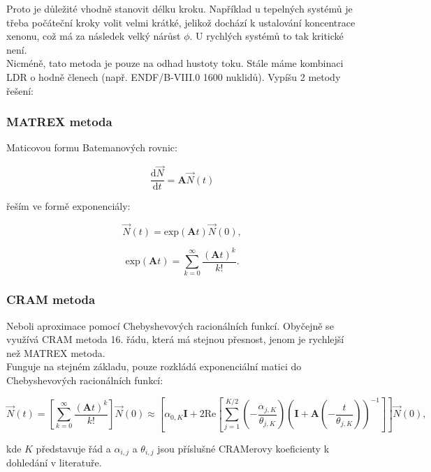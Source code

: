 Proto je důležité vhodně stanovit délku kroku. Například u tepelných systémů je třeba počáteční kroky volit velmi krátké, jelikož dochází k ustalování koncentrace xenonu, což má za následek velký nárůst $\phi$. U rychlých systémů to tak kritické není.\\

Nicméně, tato metoda je pouze na odhad hustoty toku. Stále máme kombinaci LDR o hodně členech (např. ENDF/B-VIII.0 1600 nuklidů). Vypíšu 2 metody řešení:

\subsubsection{MATREX metoda}

Maticovou formu Batemanových rovnic:

\begin{equation}
  \dfrac{\text{d}\vec{N}}{\text{d}t} = \textbf{A} \vec{N}(t)
\end{equation}

řeším ve formě exponenciály:

\begin{equation}
  \vec{N}(t) = \text{exp} (\textbf{A}t) \vec{N}(0),
\end{equation}

$$ \text{exp} (\textbf{A}t) = \sum_{k=0}^\infty \dfrac{(\textbf{A}t)^k}{k!}. $$

\subsubsection{CRAM metoda}

Neboli aproximace pomocí Chebyshevových racionálních funkcí. Obyčejně se využívá CRAM metoda 16. řádu, která má stejnou přesnost, jenom je rychlejší než MATREX metoda.\\

Funguje na stejném základu, pouze rozkládá exponenciální matici do Chebyshevových racionálních funkcí:

$$ \vec{N}(t) = \left [ \sum_{k=0}^\infty \dfrac{(\textbf{A}t)^k}{k!} \right ] \vec{N}(0) \approx \left [ \alpha_{0,K} \textbf{I} + 2 \text{Re} \left [ \sum_{j=1}^{K/2} \left ( -\dfrac{\alpha_{j,K}}{\theta_{j,K}} \right ) \left ( \textbf{I} + \textbf{A} \left ( -\dfrac{t}{\theta_{j,K}} \right ) \right ) ^{-1} \right ] \right ] \vec{N}(0), $$

kde $K$ představuje řád a $\alpha_{i,j}$ a $\theta_{i,j}$ jsou příslušné CRAMerovy koeficienty k dohledání v literatuře.
